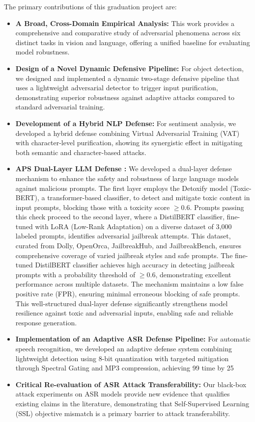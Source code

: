 \documentclass[../main.tex]{subfiles}
\begin{document}
The primary contributions of this graduation project are:
\begin{itemize}
    \item \textbf{A Broad, Cross-Domain Empirical Analysis:} This work provides a comprehensive and comparative study of adversarial phenomena across six distinct tasks in vision and language, offering a unified baseline for evaluating model robustness.
    \item \textbf{Design of a Novel Dynamic Defensive Pipeline:} For object detection, we designed and implemented a dynamic two-stage defensive pipeline that uses a lightweight adversarial detector to trigger input purification, demonstrating superior robustness against adaptive attacks compared to standard adversarial training.
    \item \textbf{Development of a Hybrid NLP Defense:} For sentiment analysis, we developed a hybrid defense combining Virtual Adversarial Training (VAT) with character-level purification, showing its synergistic effect in mitigating both semantic and character-based attacks.
    \item \textbf{ APS Dual-Layer LLM Defense : }We developed a dual-layer defense mechanism to enhance the safety and robustness of large language models against malicious prompts. The first layer employs the Detoxify model (Toxic-BERT), a transformer-based classifier, to detect and mitigate toxic content in input prompts, blocking those with a toxicity score $\geq 0.6$. Prompts passing this check proceed to the second layer, where a DistilBERT classifier, fine-tuned with LoRA (Low-Rank Adaptation) on a diverse dataset of 3,000 labeled prompts, identifies adversarial jailbreak attempts. This dataset, curated from Dolly, OpenOrca, JailbreakHub, and JailbreakBench, ensures comprehensive coverage of varied jailbreak styles and safe prompts. The fine-tuned DistilBERT classifier achieves high accuracy in detecting jailbreak prompts with a probability threshold of $\geq 0.6$, demonstrating excellent performance across multiple datasets. The mechanism maintains a low false positive rate (FPR), ensuring minimal erroneous blocking of safe prompts. This well-structured dual-layer defense significantly strengthens model resilience against toxic and adversarial inputs, enabling safe and reliable response generation.
    \item \textbf{Implementation of an Adaptive ASR Defense Pipeline: }For automatic speech
    recognition, we developed an adaptive defense system combining lightweight detection
    using 8-bit quantization with targeted mitigation through Spectral Gating and MP3
    compression, achieving 99%
 time by 25%
    \item \textbf{Critical Re-evaluation of ASR Attack Transferability:} Our black-box attack experiments on ASR models provide new evidence that qualifies existing claims in the literature, demonstrating that Self-Supervised Learning (SSL) objective mismatch is a primary barrier to attack transferability.
\end{itemize}
\end{document}
